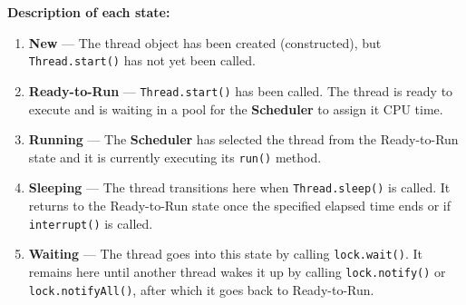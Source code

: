 \documentclass[12pt,a3paper]{article}
\begin{document}
\begin{enumerate}
\begin{tcolorbox}[enhanced,breakable,ansbox,
 colback=cF!4,colframe=cF,boxrule=0.8pt,arc=5pt,
 title={\textbf{Answer — Thread Life-Cycle (State Diagram)}},
 fonttitle=\bfseries\color{white},colbacktitle=cF]
\begin{center}
\end{center}



\medskip

\textbf{Description of each state:}

\begin{enumerate}[label=\textbf{\arabic*.}]
 \item \textbf{New} --- The thread object has been created (constructed), but \texttt{Thread.start()} has not yet been called.

 \item \textbf{Ready-to-Run} --- \texttt{Thread.start()} has been called. The thread is ready to execute and is waiting in a pool for the \textbf{Scheduler} to assign it CPU time.

 \item \textbf{Running} --- The \textbf{Scheduler} has selected the thread from the Ready-to-Run state and it is currently executing its \texttt{run()} method.

 \item \textbf{Sleeping} --- The thread transitions here when \texttt{Thread.sleep()} is called. It returns to the Ready-to-Run state once the specified elapsed time ends or if \texttt{interrupt()} is called.

 \item \textbf{Waiting} --- The thread goes into this state by calling \texttt{lock.wait()}. It remains here until another thread wakes it up by calling \texttt{lock.notify()} or \texttt{lock.notifyAll()}, after which it goes back to Ready-to-Run.


\end{enumerate}
\end{tcolorbox}
\end{enumerate}
\end{document}
